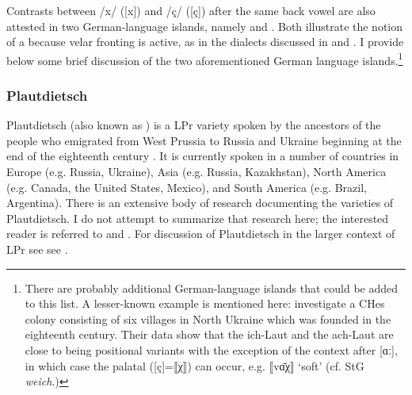 Contrasts between /x/ ([x]) and /ç/ ([ç]) after the same back vowel are also attested in two German-language islands, namely  and . Both illustrate the notion of a  because velar fronting is active, as in the dialects discussed in  and . I provide below some brief discussion of the two aforementioned German language islands.\footnote{There are probably additional German-language islands that could be added to this list. A lesser-known example is mentioned here: \citet{SokolskajaSinder1930} investigate a CHes colony consisting of six villages in North Ukraine which was founded in the eighteenth century. Their data show that the ich-Laut and the ach-Laut are close to being positional variants with the exception of the context after [ɑː], in which case the palatal ([ç]=⟦χ⟧) can occur, e.g. ⟦vɑ̄χ⟧ ‘soft' (cf. StG \textit{weich}.)}

\subsubsection{Plautdietsch}

Plautdietsch (also known as ) is a LPr variety spoken by the ancestors of the people who emigrated from West Prussia to Russia and Ukraine beginning at the end of the eighteenth century \citep{Siemens2012}. It is currently spoken in a number of countries in Europe (e.g. Russia, Ukraine), Asia (e.g. Russia, Kazakhstan), North America (e.g. Canada, the United States, Mexico), and South America (e.g. Brazil, Argentina). There is an extensive body of research documenting the varieties of Plautdietsch. I do not attempt to summarize that research here; the interested reader is referred to \citet{Siemens2012} and \citet{CoxTucker2013}. For discussion of Plautdietsch in the larger context of LPr see see .

